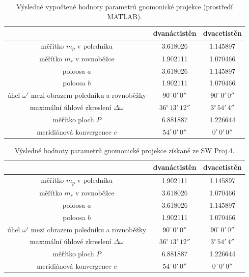 \documentclass[12pt]{article}
\begin{document}
\begin{table}[htbp]
    \centering
    \begin{tabular}{|c||c|c|}
        \hline
         & \textbf{dvanáctistěn} & \textbf{dvacetistěn} \\
        \hline\hline
        měřítko $m_p$ v poledníku & 3.618026 & 1.145897 \\
        \hline
        měřítko $m_r$ v rovnoběžce & 1.902111 & 1.070466 \\
        \hline
        poloosa $a$ & 3.618026 & 1.145897 \\
        \hline
        poloosa $b$ & 1.902111 & 1.070466 \\
        \hline
        úhel $\omega'$ mezi obrazem poledníku a rovnoběžky & $90^\circ\, 0'\, 0''$ & $90^\circ\, 0'\, 0''$ \\
        \hline
        maximální úhlové zkreslení $\Delta\omega$ & $36^\circ\, 13'\, 12''$ & $3^\circ\, 54'\, 4''$ \\
        \hline
        měřítko ploch $P$ & 6.881887 & 1.226644 \\
        \hline
        meridiánová konvergence $c$ & $54^\circ\, 0'\, 0''$ & $0^\circ\, 0'\, 0''$ \\
        \hline
    \end{tabular}
    \caption{Výsledné vypočtené hodnoty parametrů gnomonické projekce (prostředí MATLAB).}
    \label{tab:vlastnosti_matlab}
\end{table}

\begin{table}[htbp]
    \centering
    \begin{tabular}{|c||c|c|}
        \hline
         & \textbf{dvanáctistěn} & \textbf{dvacetistěn} \\
        \hline\hline
        měřítko $m_p$ v poledníku & 1.902111 & 1.145897 \\
        \hline
        měřítko $m_r$ v rovnoběžce & 3.618026 & 1.070466 \\
        \hline
        poloosa $a$ & 3.618026 & 1.145897 \\
        \hline
        poloosa $b$ & 1.902111 & 1.070466 \\
        \hline
        úhel $\omega'$ mezi obrazem poledníku a rovnoběžky & $90^\circ\, 0'\, 0''$ & $90^\circ\, 0'\, 0''$ \\
        \hline
        maximální úhlové zkreslení $\Delta\omega$ & $36^\circ\, 13'\, 12''$ & $3^\circ\, 54'\, 4''$ \\
        \hline
        měřítko ploch $P$ & 6.881887 & 1.226644 \\
        \hline
        meridiánová konvergence $c$ & $54^\circ\, 0'\, 0''$ & $0^\circ\, 0'\, 0''$ \\
        \hline
    \end{tabular}
    \caption{Výsledné hodnoty parametrů gnomonické projekce získané ze SW Proj.4.}
    \label{tab:vlastnosti_proj4}
\end{table}
\end{document}

